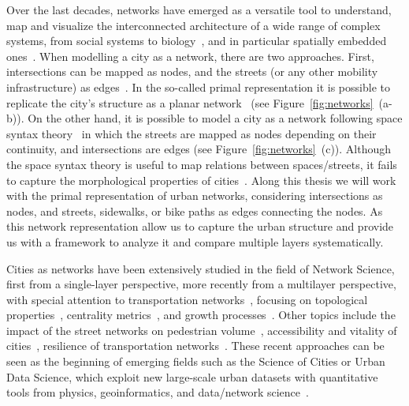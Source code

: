 Over the last decades, networks have emerged as a versatile tool to understand, map and visualize the interconnected architecture of a wide range of complex systems, from social systems to biology~\cite{albert2002statistical, dorogovtsev2002evolution, newman2003structure, boccaletti2006complex}, and in particular spatially embedded ones~\cite{barthelemy2011spatial}. When modelling a city as a network, there are two approaches. First, intersections can be mapped as nodes, and the streets (or any other mobility infrastructure) as edges~\cite{porta2006primal}. In the so-called primal representation it is possible to replicate the city's structure as a planar network~\cite{Boeing2020Planarity} (see Figure~\ref{fig:networks}~(a-b)). On the other hand, it is possible to model a city as a network following space syntax theory~\cite{hillier1976syntax} in which the streets are mapped as nodes depending on their continuity, and intersections are edges (see Figure~\ref{fig:networks}~(c)). Although the space syntax theory is useful to map relations between spaces/streets, it fails to capture the morphological properties of cities~\cite{batty2004new}. Along this thesis we will work with the primal representation of urban networks, considering intersections as nodes, and streets, sidewalks, or bike paths as edges connecting the nodes. As this network representation allow us to capture the urban structure and provide us with a framework to analyze it and compare multiple layers systematically.

Cities as networks have been extensively studied in the field of Network Science, first from a single-layer perspective, more recently from a multilayer perspective, with special attention to transportation networks~\cite{lin2013complex,barthelemy2011spatial,ding2019application}, focusing on topological properties~\cite{jiang2004topological,cardillo2006structural,barthelemy2008patterns,batty2008size,barthelemy2011spatial,strano2013comparative,louf2014typology,boeing2020multiscale}, centrality metrics~\cite{crucitti2008centrality,Boeing2020Planarity,kirkley2018structural}, and growth processes~\cite{makse1995growth,strano2012evolution}. Other topics include the impact of the street networks on pedestrian volume~\cite{hajrasouliha2015connectivity}, accessibility and vitality of cities~\cite{denadai2016death,biazzo2019accesibility}, resilience of transportation networks~\cite{baggag2018resilience,ferretti2019resilience}. These recent approaches can be seen as the beginning of emerging fields such as the Science of Cities or Urban Data Science, which exploit new large-scale urban datasets with quantitative tools from physics, geoinformatics, and data/network science~\cite{batty2013new,resch2019hds}. 

